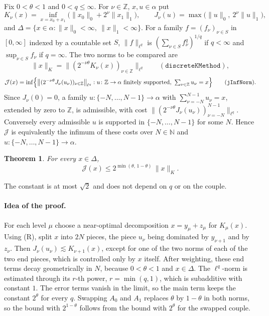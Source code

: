 \documentclass[11pt]{article}
\newtheorem{theorem}{Theorem}
\theoremstyle{definition}
\theoremstyle{remark}
\newcommand{\norm}[2]{\lVert #1\rVert_{#2}}
\newcommand{\cJ}{\mathcal J}
\newcommand{\Z}{\mathbb Z}
\begin{document}
Fix \(0 < \theta < 1\) and \(0 < q \le \infty\). For \(\nu \in \Z\), \(x, u \in \alpha\) put
\[
  K_\nu(x) = \inf_{x = x_0 + x_1} \bigl(\norm{x_0}{0} + 2^\nu \norm{x_1}{1}\bigr),
  \qquad
  J_\nu(u) = \max\bigl(\norm{u}{0},\ 2^\nu \norm{u}{1}\bigr),
\]
and \(\Delta = \{x \in \alpha : \norm{x}{0} < \infty,\ \norm{x}{1} < \infty\}\).
For a family \(f = (f_\nu)_{\nu \in S}\) in \([0,\infty]\) indexed by a countable set \(S\),
\(\norm{f}{\ell^q}\) is \((\sum_{\nu\in S} f_\nu^q)^{1/q}\) if \(q < \infty\) and
\(\sup_{\nu \in S} f_\nu\) if \(q = \infty\). The two norms to be compared are
\[
  \norm{x}{K} = \bigl\lVert (2^{-\nu\theta} K_\nu(x))_{\nu \in \Z} \bigr\rVert_{\ell^q}
  \qquad (\texttt{discreteKMethod}),
\]
\[
  \cJ(x) = \inf \Bigl\{ \bigl\lVert (2^{-\nu\theta} J_\nu(u_\nu))_{\nu \in \Z} \bigr\rVert_{\ell^q}
  : u \colon \Z \to \alpha \text{ finitely supported},\ \textstyle\sum_{\nu \in \Z} u_\nu = x \Bigr\}
  \qquad (\texttt{jInfNorm}).
\]
Since \(J_\nu(0) = 0\), a family \(u \colon \{-N, \dots, N-1\} \to \alpha\) with \(\sum_{\nu=-N}^{N-1} u_\nu = x\), extended by zero to \(\Z\), is
admissible, with cost \(\lVert (2^{-\nu\theta} J_\nu(u_\nu))_{\nu=-N}^{N-1} \rVert_{\ell^q}\).
Conversely every admissible \(u\) is supported in \(\{-N, \dots, N-1\}\) for some \(N\). Hence \(\cJ\) is equivalently the
infimum of these costs over \(N \in \mathbb N\) and \(u \colon \{-N, \dots, N-1\} \to \alpha\).

\begin{theorem}\label{thm:main}
  For every \(x \in \Delta\),
  \[
    \cJ(x) \le 2^{\min(\theta,\, 1-\theta)}\, \norm{x}{K} .
  \]
\end{theorem}

The constant is at most \(\sqrt 2\) and does not depend on \(q\) or on the couple.

\paragraph{Idea of the proof.}
For each level \(\mu\) choose a near-optimal decomposition \(x = y_\mu + z_\mu\) for
\(K_\mu(x)\). Using (R), split \(x\) into \(2N\) pieces, the piece \(u_\nu\) being dominated
by \(y_{\nu+1}\) and by \(z_\nu\). Then \(J_\nu(u_\nu) \lesssim K_{\nu+1}(x)\), except for one
of the two norms of each of the two end pieces, which is controlled only by \(x\) itself.
After weighting, these end terms decay geometrically in \(N\), because \(0<\theta<1\) and
\(x \in \Delta\). The \(\ell^q\)-norm is estimated through its \(r\)-th power,
\(r = \min(q,1)\), which is subadditive with constant \(1\). The error terms vanish in the
limit, so the main term keeps the constant \(2^\theta\) for every \(q\).
Swapping \(A_0\) and \(A_1\) replaces \(\theta\) by \(1-\theta\) in both norms, so the bound
with \(2^{1-\theta}\) follows from the bound with \(2^\theta\) for the swapped couple.
\end{document}
